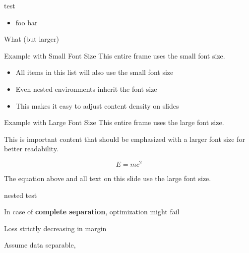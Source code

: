 \documentclass[11pt,compress,t,notes=noshow, xcolor=table]{beamer}
\begin{document}
\begin{frame}{test}
  \begin{itemize}
    \item foo bar
  \end{itemize}
  \begin{itemizeM}[Large]
    \item What (but larger)
  \end{itemizeM}
\end{frame}

\begin{frame2}[small]{Example with Small Font Size}
  This entire frame uses the small font size.
  
  \begin{itemize}
    \item All items in this list will also use the small font size
    \item Even nested environments inherit the font size
    \item This makes it easy to adjust content density on slides
  \end{itemize}
\end{frame2}

\begin{frame2}[LARGE]{Example with Large Font Size}
  This entire frame uses the large font size.
  
  \begin{center}
    This is important content that should be emphasized
    with a larger font size for better readability.
  \end{center}
  
  \begin{equation}
    E = mc^2
  \end{equation}
  
  The equation above and all text on this slide use the large font size.
\end{frame2}


\begin{frame}{nested test}
  \begin{footnotesize}
    \begin{itemize}
    \item In case of \textbf{complete separation}, optimization might 
    fail
    \begin{minipage}{0.6\textwidth}
    \item Loss strictly decreasing in margin
    \end{minipage}
    \begin{minipage}{0.30\textwidth}
    \end{minipage}%
    
    \item Assume data separable,
    \end{itemize} 
  \end{footnotesize}
\end{frame}

\endlecture
\end{document}
